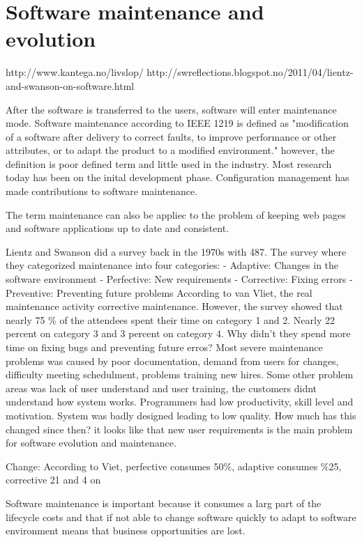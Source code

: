 \section{Software maintenance and evolution}
http://www.kantega.no/livslop/
http://swreflections.blogspot.no/2011/04/lientz-and-swanson-on-software.html

After the software is transferred to the users, software will enter maintenance mode. Software maintenance according to IEEE 1219 is defined as "modification of a software after delivery to correct faults, to improve performance or other attributes, or to adapt the product to a modified environment." however, the definition is poor defined term and little used in the industry. Most research today has been on the inital development phase. Configuration management has made contributions to software maintenance. 

The term maintenance can also be appliec to the problem of keeping web pages and software applications up to date and consistent.

Lientz and Swanson did a survey back in the 1970s with 487. The survey where they categorized maintenance into four categories:
- Adaptive: Changes in the software environment
- Perfective: New requirements
- Corrective: Fixing errors
- Preventive: Preventing future problems
According to van Vliet, the real maintenance activity corrective maintenance. However, the survey showed that nearly 75 \% of the attendees spent their time on category 1 and 2. Nearly 22 percent on category 3 and 3 percent on category 4. Why didn't they spend more time on fixing bugs and preventing future erros? Most severe maintenance problems was caused by poor documentation, demand from users for changes, difficulty meeting schedulment, problems training new hires.  Some other problem areas was lack of user understand and user training, the customers didnt understand how system works. Programmers had low productivity, skill level and motivation. System was badly designed leading to low quality. How much has this changed since then? it looks like that new user requirements is the main problem for software evolution and maintenance.

Change: According to Viet, perfective consumes 50\%, adaptive consumes \%25, corrective 21 and 4 on 

Software maintenance is important because it consumes a larg part of the lifecycle costs and that if not able to change software quickly to adapt to software environment means that business opportunities are lost.


